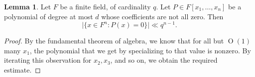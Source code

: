 \documentclass[reqno]{amsart}
\def\O{\operatorname{O}}
\theoremstyle{plain} \newtheorem{theorem} {Theorem} \newtheorem{conjecture} {Conjecture} \newtheorem{corollary} [theorem] {Corollary} \newtheorem{proposition} [theorem] {Proposition} \newtheorem{fact} [theorem] {Fact}
\theoremstyle{definition} \newtheorem{definition} [theorem] {Definition}
\theoremstyle{itplain} %
\newtheorem{lemma}[theorem]{Lemma}
\begin{document}
\begin{lemma}\label{lemma:hypersurface-count}
  Let $F$ be a finite field, of cardinality $q$.  Let $P \in F[x_1,\dotsc,x_n]$ be a polynomial of degree at most $d$ whose coefficients are not all zero.  Then
  \begin{equation*}
    \lvert \{x \in F^n : P(x) = 0\} \rvert \ll q^{n-1}.
  \end{equation*}
\end{lemma}
\begin{proof}
  By the fundamental theorem of algebra, we know that for all but $\O(1)$ many $x_1$, the polynomial that we get by specializing to that value is nonzero.  By iterating this observation for $x_2, x_3$, and so on, we obtain the required estimate.
\end{proof}
\end{document}
